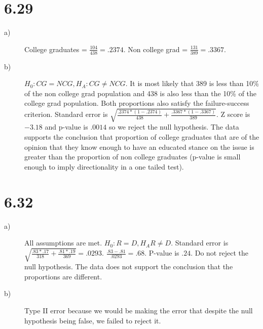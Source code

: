 \documentclass{article}
\begin{document}
\section*{6.29}
\begin{description}
    \item[a)] College graduates = $\frac{104}{438} = .2374$. Non college grad = 
        $\frac{131}{389} = .3367$.
    \item[b)] $H_0: CG = NCG, H_A: CG \neq NCG$. It is most likely that 389 is 
        less than 10\% of the non college grad population and 438 is also less
        than the 10\% of the college grad population. Both proportions also
        satisfy the failure-success criterion. Standard error is $\sqrt{
        \frac{.2374*(1-.2374)}{438} + \frac{.3367*(1-.3367)}{389}}$. 
        Z score is $-3.18$ and p-value is $.0014$ so we reject the null 
        hypothesis. The data supports the conclusion that proportion of 
        college graduates that are of the opinion that they know enough to 
        have an educated stance on the issue is greater than the 
        proportion of non college graduates (p-value is small enough
        to imply directionality in a one tailed test).
\end{description}

\section*{6.32}
\begin{description}
    \item[a)] All assumptions are met. $H_0: R = D, H_A R \neq D$. 
        Standard error is $\sqrt{\frac{.83*.17}{318} + \frac{.81*.19}{369}} = 
        .0293$. $\frac{.83 - .81}{.0293} = .68$. P-value is $.24$. Do not 
        reject the null hypothesis. The data does not support the conclusion
        that the proportions are different.
    \item[b)] Type II error because we would be making the error
        that despite the null hypothesis being false, we failed to reject it.
\end{description}
\end{document}
